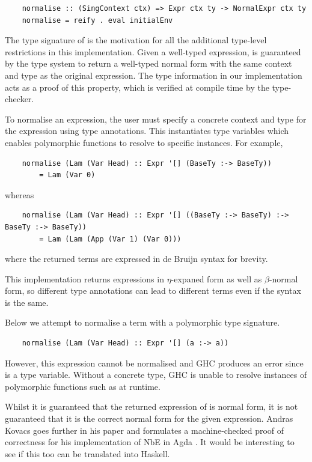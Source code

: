 \begin{lstlisting}
    normalise :: (SingContext ctx) => Expr ctx ty -> NormalExpr ctx ty
    normalise = reify . eval initialEnv
\end{lstlisting}

The type signature of  is the motivation for all the additional type-level restrictions in this implementation. Given a well-typed expression,  is guaranteed by the type system to return a well-typed normal form with the same context and type as the original expression. The type information in our implementation acts as a proof of this property, which is verified at compile time by the type-checker.

To normalise an expression, the user must specify a concrete context and type for the expression using type annotations. This instantiates type variables which enables polymorphic functions to resolve to specific instances. For example,

\begin{lstlisting}
    normalise (Lam (Var Head) :: Expr '[] (BaseTy :-> BaseTy)) 
        = Lam (Var 0)
\end{lstlisting}

whereas

\begin{lstlisting}
    normalise (Lam (Var Head) :: Expr '[] ((BaseTy :-> BaseTy) :-> BaseTy :-> BaseTy))
        = Lam (Lam (App (Var 1) (Var 0)))
\end{lstlisting}

where the returned terms are expressed in de Bruijn syntax for brevity.

This implementation returns expressions in $\eta$-expaned form as well as $\beta$-normal form, so different type annotations can lead to different terms even if the syntax is the same. 

Below we attempt to normalise a term with a polymorphic type signature.

\begin{lstlisting}
    normalise (Lam (Var Head) :: Expr '[] (a :-> a))
\end{lstlisting}

However, this expression cannot be normalised and GHC produces an error since  is a type variable. Without a concrete type, GHC is unable to resolve instances of polymorphic functions such as  at runtime.

Whilst it is guaranteed that the returned expression of  is normal form, it is not guaranteed that it is the correct normal form for the given expression. Andras Kovacs goes further in his paper and formulates a machine-checked proof of correctness for his implementation of NbE in Agda \cite{AgdaNbe}. It would be interesting to see if this too can be translated into Haskell.

